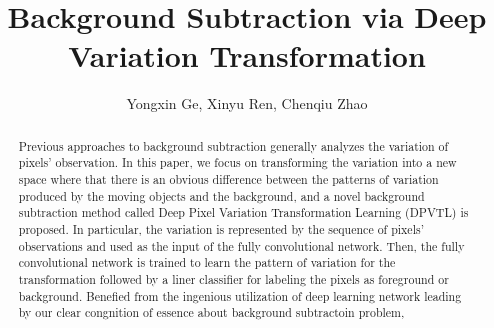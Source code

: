 \documentclass[journal]{IEEEtran}
\begin{document}
\title{Background Subtraction via Deep Variation Transformation}

\author{Yongxin Ge, 
        Xinyu Ren, 
        Chenqiu Zhao}



\maketitle



\begin{abstract}
%
Previous approaches to background subtraction generally analyzes the variation of pixels' observation.
%
%
%
%
In this paper, we focus on transforming the variation into a new space where that there is an obvious difference between the patterns of variation produced by the moving objects and the background,
and a novel background subtraction method called Deep Pixel Variation Transformation Learning (DPVTL) is proposed.
%
% 
%     
%     
%
In particular,
the variation is represented by the sequence of pixels' observations and used as the input of the fully convolutional network.
%
Then, the fully convolutional network is trained to learn the pattern of variation for the transformation followed by a liner classifier for labeling the pixels as foreground or background.
Benefied from the ingenious utilization of deep learning network leading by our clear congnition of essence about background subtractoin problem,

\end{abstract}
\end{document}

